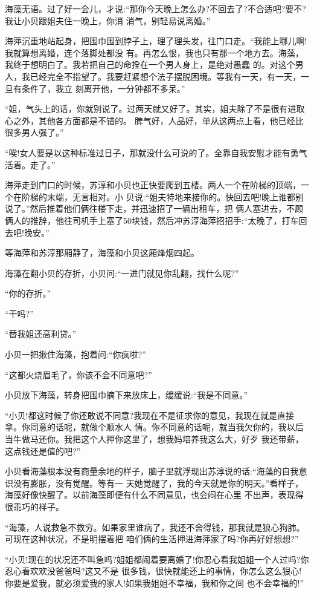 \documentclass[11pt,a4paper,onecolumn]{article}
\begin{document}
海藻无语。过了好一会儿，才说:``那你今天晚上怎么办?不回去了?不合适吧?要不?我让小贝跟姐夫住一晚上，你消
消气，别轻易说离婚。''

海萍沉重地站起身，把围巾围到脖子上，理了理头发，往门口走。``我能上哪儿啊!我就算想离婚，连个落脚处都没
有。再怎么恨，我也只有那一个地方去。海藻，我终于想明白了。我若把自己的命拴在一个男人身上，是绝对愚蠢
的。对这个男人，我已经完全不指望了。我要赶紧想个法子摆脱困境。等我有一天，有一天，一旦有条件了，我立
刻离开他，一分钟都不多呆。''

``姐，气头上的话，你就别说了。过两天就又好了。其实，姐夫除了不是很有进取心之外，其他各方面都是不错的。
脾气好，人品好，单从这两点上看，他已经比很多男人强了。''

``唉!女人要是以这种标准过日子，那就没什么可说的了。全靠自我安慰才能有勇气活着。走了。''

海萍走到门口的时候，苏淳和小贝也正快要爬到五楼。两人一个在阶梯的顶端，一个在阶梯的末端，无言相对。小
贝说:``姐夫特地来接你的。快回去吧!晚上谁都别说了。''然后推着他们俩往楼下走，并迅速招了一辆出租车，把
俩人塞进去，不顾俩人的推辞，他往司机手上塞了50块钱，然后冲苏淳海萍招招手:``太晚了，打车回去吧!晚安。''

等海萍和苏淳那厢静了，海藻和小贝这厢烽烟四起。

海藻在翻小贝的存折，小贝问:``一进门就见你乱翻，找什么呢?''

``你的存折。''

``干吗?''

``替我姐还高利贷。''

小贝一把揪住海藻，抱着问:``你疯啦?''

``这都火烧眉毛了，你该不会不同意吧?''

小贝放下海藻，转身把围巾摘下来放床上，缓缓说:``我是不同意。''

``小贝!都这时候了你还敢说不同意?我现在不是征求你的意见，我现在就是直接拿。你同意的话呢，就做个顺水人
情。你不同意的话呢，就当我欠你的，我以后当牛做马还你。我把这个人押你这里了，想我妈培养我这么大，好歹
我还带薪，这点钱还是值的吧?''

小贝看海藻根本没有商量余地的样子，脑子里就浮现出苏淳说的话:``海藻的自我意识没有膨胀，没有觉醒。等有一
天她觉醒了，我的今天就是你的明天。''看样子，海藻好像快醒了。以前海藻即便有什么不同意见，也会闷在心里
不出声，表现得很乖巧的样子。

``海藻，人说救急不救穷。如果家里谁病了，我还不舍得钱，那我就是狼心狗肺。可现在这种状况，不是明摆着把
咱们俩的生活押进海萍家了吗?你再好好想想?''

``小贝!现在的状况还不叫急吗?姐姐都闹着要离婚了!你忍心看我姐姐一个人过吗?你忍心看欢欢没爸爸吗?这又不是
很多钱，很快就能还上的事情，你怎么这么狠心!你要是爱我，就必须爱我的家人!如果我姐姐不幸福，我和你之间
也不会幸福的!''
\end{document}
